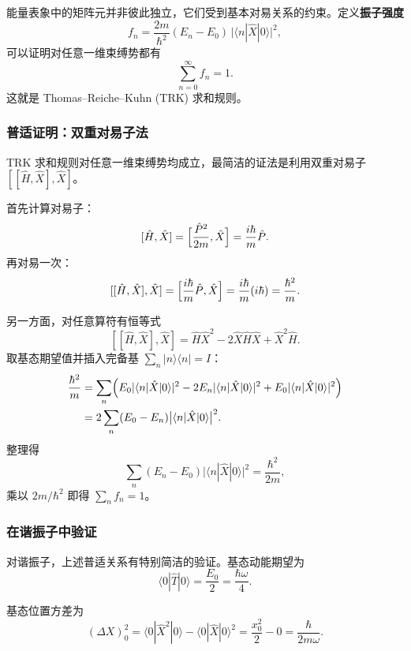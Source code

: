 能量表象中的矩阵元并非彼此独立，它们受到基本对易关系的约束。定义\textbf{振子强度}
\begin{equation}
f_n = \frac{2m}{\hbar^2}(E_n - E_0)\,\bigl|\langle n|\hat{X}|0\rangle\bigr|^2,
\end{equation}
可以证明对任意一维束缚势都有
\begin{equation}
\boxed{\sum_{n=0}^{\infty} f_n = 1.}
\end{equation}
这就是 Thomas--Reiche--Kuhn (TRK) 求和规则。

\subsubsection{普适证明：双重对易子法}

TRK 求和规则对任意一维束缚势均成立，最简洁的证法是利用双重对易子 $[[\hat{H},\hat{X}],\hat{X}]$。

\begin{derivationbox}[双重对易子法]
首先计算对易子：
\[
[\hat{H}, \hat{X}] = \Bigl[\frac{\hat{P}^2}{2m}, \hat{X}\Bigr] = \frac{i\hbar}{m}\hat{P}.
\]
再对易一次：
\[
[[\hat{H}, \hat{X}], \hat{X}] = \Bigl[\frac{i\hbar}{m}\hat{P}, \hat{X}\Bigr] = \frac{i\hbar}{m}(i\hbar) = \frac{\hbar^2}{m}.
\]

另一方面，对任意算符有恒等式
\[
[[\hat{H},\hat{X}],\hat{X}] = \hat{H}\hat{X}^2 - 2\hat{X}\hat{H}\hat{X} + \hat{X}^2\hat{H}.
\]
取基态期望值并插入完备基 $\sum_n|n\rangle\langle n|=I$：
\begin{align*}
\frac{\hbar^2}{m}
&= \sum_n\Bigl(E_0|\langle n|\hat{X}|0\rangle|^2 - 2E_n|\langle n|\hat{X}|0\rangle|^2 + E_0|\langle n|\hat{X}|0\rangle|^2\Bigr) \\
&= 2\sum_n(E_0 - E_n)\bigl|\langle n|\hat{X}|0\rangle\bigr|^2.
\end{align*}
整理得
\[
\sum_n(E_n - E_0)\bigl|\langle n|\hat{X}|0\rangle\bigr|^2 = \frac{\hbar^2}{2m},
\]
乘以 $2m/\hbar^2$ 即得 $\sum_n f_n = 1$。
\end{derivationbox}

\subsubsection{在谐振子中验证}

对谐振子，上述普适关系有特别简洁的验证。基态动能期望为
\[
\langle 0|\hat{T}|0\rangle = \frac{E_0}{2} = \frac{\hbar\omega}{4}.
\]

基态位置方差为
\[
(\Delta X)_0^2 = \langle 0|\hat{X}^2|0\rangle - \langle 0|\hat{X}|0\rangle^2 = \frac{x_0^2}{2} - 0 = \frac{\hbar}{2m\omega}.
\]


